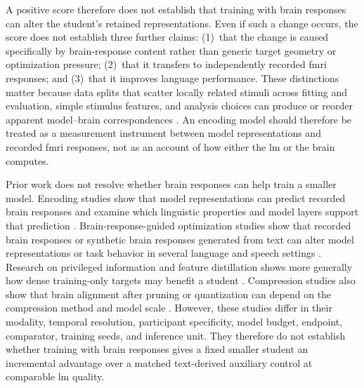 A positive score therefore does not establish that training with brain responses can alter the student's retained representations.
Even if such a change occurs, the score does not establish three further claims: (1)\ that the change is caused specifically by brain-response content rather than generic target geometry or optimization pressure; (2)\ that it transfers to independently recorded \ac{fmri} responses; and (3)\ that it improves language performance.
These distinctions matter because data splits that scatter locally related stimuli across fitting and evaluation, simple stimulus features, and analysis choices can produce or reorder apparent model--brain correspondences \autocite{hadidi2026,jia2026}.
An encoding model should therefore be treated as a measurement instrument between model representations and recorded \ac{fmri} responses, not as an account of how either the \ac{lm} or the brain computes.

Prior work does not resolve whether brain responses can help train a smaller model.
Encoding studies show that model representations can predict recorded brain responses and examine which linguistic properties and model layers support that prediction \autocite{oota2023,merlin2024}.
Brain-response-guided optimization studies show that recorded brain responses or synthetic brain responses generated from text can alter model representations or task behavior in several language and speech settings \autocite{moussa2025,negi2025,merlinData2026,vaidya2026}.
Research on privileged information and feature distillation shows more generally how dense training-only targets may benefit a student \autocite{lopezpaz2016,saadi2025}.
Compression studies also show that brain alignment after pruning or quantization can depend on the compression method and model scale \autocite{oota2026}.
However, these studies differ in their modality, temporal resolution, participant specificity, model budget, endpoint, comparator, training seeds, and inference unit.
They therefore do not establish whether training with brain responses gives a fixed smaller student an incremental advantage over a matched text-derived auxiliary control at comparable \ac{lm} quality.

